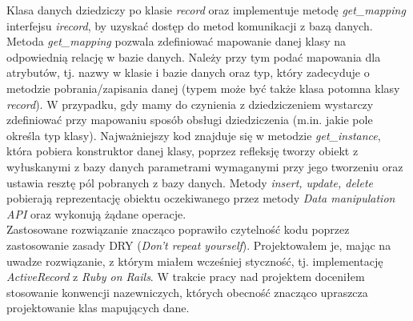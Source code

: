 Klasa danych dziedziczy po klasie \emph{record} oraz implementuje metodę \emph{get\_mapping} interfejsu \emph{irecord}, by uzyskać dostęp do metod komunikacji z bazą danych. Metoda \emph{get\_mapping} pozwala zdefiniować mapowanie danej klasy na odpowiednią relację w bazie danych. Należy przy tym podać mapowania dla atrybutów, tj. nazwy w klasie i bazie danych oraz typ, który zadecyduje o metodzie pobrania/zapisania danej (typem może być także klasa potomna klasy \emph{record}). W przypadku, gdy mamy do czynienia z dziedziczeniem wystarczy zdefiniować przy mapowaniu sposób obsługi dziedziczenia (m.in. jakie pole określa typ klasy). Najważniejszy kod znajduje się w metodzie \emph{get\_instance}, która pobiera konstruktor danej klasy, poprzez refleksję tworzy obiekt z wyłuskanymi z bazy danych parametrami wymaganymi przy jego tworzeniu oraz ustawia resztę pól pobranych z bazy danych. Metody \emph{insert, update, delete} pobierają reprezentację obiektu oczekiwanego przez metody \emph{Data manipulation API} oraz wykonują żądane operacje.\\
Zastosowane rozwiązanie znacząco poprawiło czytelność kodu poprzez zastosowanie zasady DRY (\emph{Don't repeat yourself}). Projektowałem je, mając na uwadze rozwiązanie, z którym miałem wcześniej styczność, tj. implementację \emph{ActiveRecord} z \emph{Ruby on Rails}. W trakcie pracy nad projektem doceniłem stosowanie konwencji nazewniczych, których obecność znacząco upraszcza projektowanie klas mapujących dane.

%

